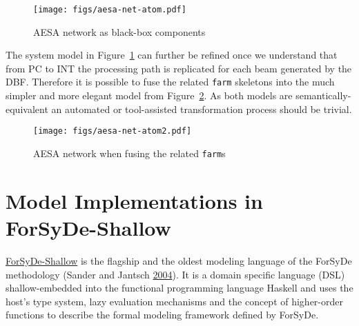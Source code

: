\documentclass[
  a4paper,
]{article}
\newenvironment{Shaded}{}{}
\newcommand{\DataTypeTok}[1]{\textcolor[rgb]{0.56,0.13,0.00}{#1}}
\newcommand{\FunctionTok}[1]{\textcolor[rgb]{0.02,0.16,0.49}{#1}}
\newcommand{\KeywordTok}[1]{\textcolor[rgb]{0.00,0.44,0.13}{\textbf{#1}}}
\newcommand{\NormalTok}[1]{#1}
\newcommand{\OtherTok}[1]{\textcolor[rgb]{0.00,0.44,0.13}{#1}}
\begin{document}
\begin{figure}
\hypertarget{fig:aesa-net-atom}{%
\centering
\texttt{[image: figs/aesa-net-atom.pdf]}
\caption{AESA network as black-box components}\label{fig:aesa-net-atom}
}
\end{figure}

\begin{Shaded}
\end{Shaded}

The system model in Figure~\ref{fig:aesa-net-atom} can further be
refined once we understand that from PC to INT the processing path is
replicated for each beam generated by the DBF. Therefore it is possible
to fuse the related \texttt{farm} skeletons into the much simpler and
more elegant model from Figure~\ref{fig:aesa-net-atom2}. As both models
are semantically-equivalent an automated or tool-assisted transformation
process should be trivial.

\begin{figure}
\hypertarget{fig:aesa-net-atom2}{%
\centering
\texttt{[image: figs/aesa-net-atom2.pdf]}
\caption{AESA network when fusing the related
\texttt{farm}s}\label{fig:aesa-net-atom2}
}
\end{figure}

\hypertarget{sec:shallow}{%
\section{Model Implementations in ForSyDe-Shallow}\label{sec:shallow}}

\href{https://forsyde.github.io/forsyde-shallow/}{ForSyDe-Shallow} is
the flagship and the oldest modeling language of the ForSyDe methodology
(Sander and Jantsch \protect\hyperlink{ref-sander-2004}{2004}). It is a
domain specific language (DSL) shallow-embedded into the functional
programming language Haskell and uses the host's type system, lazy
evaluation mechanisms and the concept of higher-order functions to
describe the formal modeling framework defined by ForSyDe.
\end{document}
